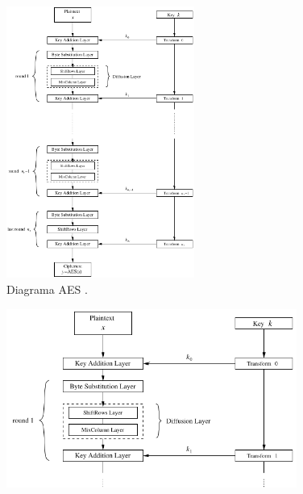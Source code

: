 \begin{frame}[allowframebreaks]
\begin{figure}[h]
\centering
\includegraphics[width=0.55\textwidth,height=0.7\textheight,keepaspectratio]{figures/AES-diagrama.png}
\caption{Diagrama AES \cite{paar2014}.}
\label{fig-AES-diagrama}
\end{figure}

\framebreak

\begin{figure}[h]
\centering
\includegraphics[width=0.85\textwidth,height=0.7\textheight,keepaspectratio]{figures/AES-diagrama-z1.png}
\label{fig-AES-diagrama-z1}
\end{figure}

 \framebreak


\end{frame}
